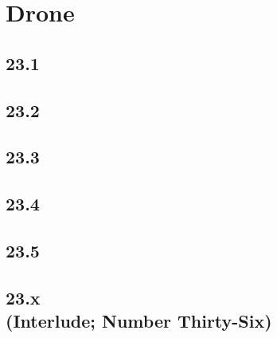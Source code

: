 \part{Drone}

 \chapter{23.1}

 \chapter{23.2}

 \chapter{23.3}

 \chapter{23.4}

 \chapter{23.5}

 \chapter[23.x (Interlude; Number Thirty-Six)]{23.x\\(Interlude; Number Thirty-Six)}







